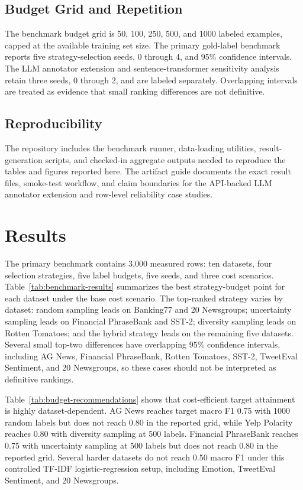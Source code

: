 \documentclass[11pt]{article}
\begin{document}
\subsection{Budget Grid and Repetition}

The benchmark budget grid is 50, 100, 250, 500, and 1000 labeled examples, capped at the available training set size. The primary gold-label benchmark reports five strategy-selection seeds, 0 through 4, and 95\% confidence intervals. The LLM annotator extension and sentence-transformer sensitivity analysis retain three seeds, 0 through 2, and are labeled separately. Overlapping intervals are treated as evidence that small ranking differences are not definitive.

\subsection{Reproducibility}

The repository includes the benchmark runner, data-loading utilities, result-generation scripts,
and checked-in aggregate outputs needed to reproduce the tables and figures reported here. The
artifact guide documents the exact result files, smoke-test workflow, and claim boundaries for the
API-backed LLM annotator extension and row-level reliability case studies.

\section{Results}

The primary benchmark contains 3,000 measured rows: ten datasets, four selection strategies, five label budgets, five seeds, and three cost scenarios. Table~\ref{tab:benchmark-results} summarizes the best strategy-budget point for each dataset under the base cost scenario. The top-ranked strategy varies by dataset: random sampling leads on Banking77 and 20 Newsgroups; uncertainty sampling leads on Financial PhraseBank and SST-2; diversity sampling leads on Rotten Tomatoes; and the hybrid strategy leads on the remaining five datasets. Several small top-two differences have overlapping 95\% confidence intervals, including AG News, Financial PhraseBank, Rotten Tomatoes, SST-2, TweetEval Sentiment, and 20 Newsgroups, so these cases should not be interpreted as definitive rankings.



Table~\ref{tab:budget-recommendations} shows that cost-efficient target attainment is highly dataset-dependent. AG News reaches target macro F1 0.75 with 1000 random labels but does not reach 0.80 in the reported grid, while Yelp Polarity reaches 0.80 with diversity sampling at 500 labels. Financial PhraseBank reaches 0.75 with uncertainty sampling at 500 labels but does not reach 0.80 in the reported grid. Several harder datasets do not reach 0.50 macro F1 under this controlled TF-IDF logistic-regression setup, including Emotion, TweetEval Sentiment, and 20 Newsgroups.
\end{document}
